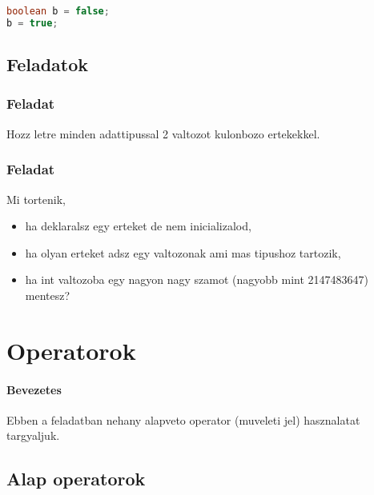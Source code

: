 \documentclass{article}
\begin{document}
\begin{lstlisting}[language=Java, caption=Egy false kezdoerteku boolean valtozot modositunk.]
boolean b = false;
b = true;
\end{lstlisting}

\newpage

\subsection{Feladatok}

\subsubsection{Feladat}

Hozz letre minden adattipussal 2 valtozot kulonbozo ertekekkel.

\subsubsection{Feladat}

Mi tortenik,
\begin{itemize}
    \item ha deklaralsz egy erteket de nem inicializalod,
    \item ha olyan erteket adsz egy valtozonak ami mas tipushoz tartozik,
    \item ha int valtozoba egy nagyon nagy szamot (nagyobb mint 2147483647) mentesz?
\end{itemize}

\newpage
\section{Operatorok}

\paragraph{Bevezetes}

Ebben a feladatban nehany alapveto operator (muveleti jel) hasznalatat targyaljuk.

\subsection{Alap operatorok}
\end{document}
